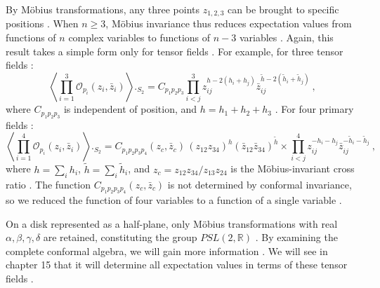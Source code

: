By Möbius transformations, any three points $z_{1,2,3}$ can be brought to specific positions . When $n \geq 3$, Möbius invariance thus reduces expectation values from functions of $n$ complex variables to functions of $n-3$ variables . Again, this result takes a simple form only for tensor fields . For example, for three tensor fields :
\begin{equation}
	\left\langle\prod_{i=1}^{3} \mathcal{O}_{p_{i}}(z_{i}, \bar{z}_{i})\right\rangle\bigg._{\!\!S_{2}}
	=C_{p_{1} p_{2} p_{3}} 
	\prod_{i<j}^{3} z_{i j}^{h-2(h_{i}+h_{j})} \bar{z}_{i j}^{\tilde{h}-2(\tilde{h}_{i}+\tilde{h}_{j})} \:, \label{6.7.6}
\end{equation}
where $C_{p_{1} p_{2} p_{3}}$ is independent of position, and $h=h_{1}+h_{2}+h_{3}$ . For four primary fields :
\begin{equation}
	\left\langle\prod_{i=1}^{4} \mathcal{O}_{p_{i}}(z_{i}, \bar{z}_{i})\right\rangle\bigg._{\!\!S_{2}}
	=C_{p_{1} p_{2} p_{3} p_{4}}(z_{c}, \bar{z}_{c}) \, (z_{12} z_{34})^{h}(\bar{z}_{12} \bar{z}_{34})^{\tilde{h}} \times 
	\prod_{i<j}^{4} z_{i j}^{-h_{i}-h_{j}} \bar{z}_{i j}^{-\tilde{h}_{i}-\tilde{h}_{j}} \:, \label{6.7.7}
\end{equation}
where $h=\sum_{i} h_{i}$, $\tilde{h}=\sum_{i} \tilde{h}_{i}$, and $z_{c}=z_{12} z_{34} / z_{13} z_{24}$ is the Möbius-invariant cross ratio . The function $C_{p_{1} p_{2} p_{3} p_{4}}(z_{c}, \bar{z}_{c})$ is not determined by conformal invariance, so we reduced the function of four variables to a function of a single variable .

On a disk represented as a half-plane, only Möbius transformations with real $\alpha, \beta, \gamma, \delta$ are retained, constituting the group $PSL(2, \mathds{R})$ . By examining the complete conformal algebra, we will gain more information . We will see in chapter 15 that it will determine all expectation values in terms of these tensor fields .

